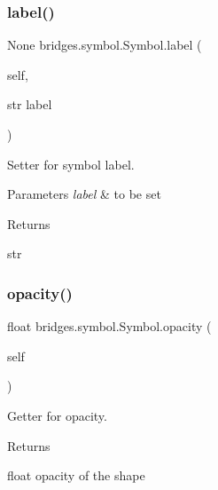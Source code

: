 \subsubsection{\texorpdfstring{label()}{label()}\hspace{0.1cm}{\footnotesize\ttfamily [2/2]}}
{\footnotesize\ttfamily  None bridges.\+symbol.\+Symbol.\+label (\begin{DoxyParamCaption}\item[{}]{self,  }\item[{str}]{label }\end{DoxyParamCaption})}



Setter for symbol label. 


\begin{DoxyParams}{Parameters}
{\em label} & to be set \\
\hline
\end{DoxyParams}
\begin{DoxyReturn}{Returns}


str 
\end{DoxyReturn}
\mbox{\label{classbridges_1_1symbol_1_1_symbol_a106d50442312ff1960ccb2ca9174693d}} 
\subsubsection{\texorpdfstring{opacity()}{opacity()}\hspace{0.1cm}{\footnotesize\ttfamily [1/2]}}
{\footnotesize\ttfamily  float bridges.\+symbol.\+Symbol.\+opacity (\begin{DoxyParamCaption}\item[{}]{self }\end{DoxyParamCaption})}



Getter for opacity. 

\begin{DoxyReturn}{Returns}


float opacity of the shape 
\end{DoxyReturn}
\mbox{\label{classbridges_1_1symbol_1_1_symbol_adcbf330ad1608b4d9d37d7da515bb6e2}} 
